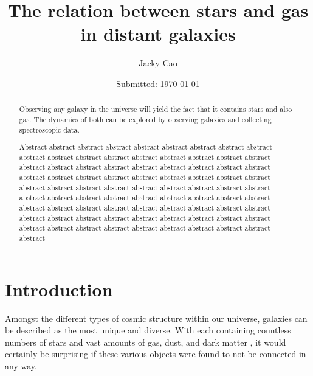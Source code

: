 \documentclass[12pt, twocolumn]{revtex4}    %
\begin{document}
                     


\title{The relation between stars and gas in distant galaxies} 
\date{Submitted: \today{}}
\author{Jacky Cao}

\begin{abstract}              
 
 Observing any galaxy in the universe will yield the fact that it contains stars and also gas. The dynamics of both can be explored by observing galaxies and collecting spectroscopic data. 
 
Abstract abstract abstract abstract abstract abstract abstract abstract abstract abstract abstract abstract abstract abstract abstract abstract abstract abstract abstract abstract abstract abstract abstract abstract abstract abstract abstract abstract abstract abstract abstract abstract abstract abstract abstract abstract abstract abstract abstract abstract abstract abstract abstract abstract abstract abstract abstract abstract abstract abstract abstract abstract abstract abstract abstract abstract abstract abstract abstract abstract abstract abstract abstract abstract abstract abstract abstract abstract abstract abstract abstract abstract abstract abstract abstract abstract abstract abstract abstract abstract abstract abstract 

\end{abstract}

\maketitle

\tableofcontents

\newpage

\section{Introduction} 

Amongst the different types of cosmic structure within our universe, galaxies can be described as the most unique and diverse. With each containing countless numbers of stars and vast amounts of gas, dust, and dark matter \cite{carroll_astro}, it would certainly be surprising if these various objects were found to not be connected in any way.
\end{document}
